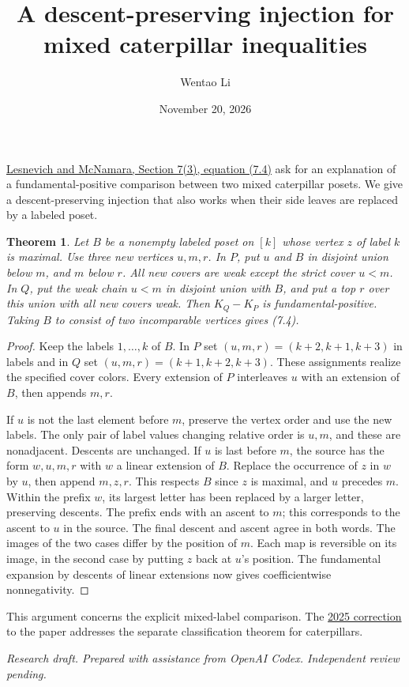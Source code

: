 \documentclass[11pt]{article}
\title{A descent-preserving injection for mixed caterpillar inequalities}
\author{Wentao Li}
\date{November 20, 2026}
\newtheorem{theorem}{Theorem}
\begin{document}
\maketitle

\href{https://arxiv.org/abs/2006.10087}{Lesnevich and McNamara, Section 7(3), equation (7.4)} ask for an explanation of a fundamental-positive comparison between two mixed caterpillar posets. We give a descent-preserving injection that also works when their side leaves are replaced by a labeled poset.
\begin{theorem}Let $B$ be a nonempty labeled poset on $[k]$ whose vertex $z$ of label $k$ is maximal. Use three new vertices $u,m,r$. In $P$, put $u$ and $B$ in disjoint union below $m$, and $m$ below $r$. All new covers are weak except the strict cover $u<m$. In $Q$, put the weak chain $u<m$ in disjoint union with $B$, and put a top $r$ over this union with all new covers weak. Then $K_Q-K_P$ is fundamental-positive. Taking $B$ to consist of two incomparable vertices gives (7.4).\end{theorem}
\begin{proof}Keep the labels $1,\ldots,k$ of $B$. In $P$ set $(u,m,r)=(k+2,k+1,k+3)$ in labels and in $Q$ set $(u,m,r)=(k+1,k+2,k+3)$. These assignments realize the specified cover colors. Every extension of $P$ interleaves $u$ with an extension of $B$, then appends $m,r$.

If $u$ is not the last element before $m$, preserve the vertex order and use the new labels. The only pair of label values changing relative order is $u,m$, and these are nonadjacent. Descents are unchanged. If $u$ is last before $m$, the source has the form $w,u,m,r$ with $w$ a linear extension of $B$. Replace the occurrence of $z$ in $w$ by $u$, then append $m,z,r$. This respects $B$ since $z$ is maximal, and $u$ precedes $m$. Within the prefix $w$, its largest letter has been replaced by a larger letter, preserving descents. The prefix ends with an ascent to $m$; this corresponds to the ascent to $u$ in the source. The final descent and ascent agree in both words. The images of the two cases differ by the position of $m$. Each map is reversible on its image, in the second case by putting $z$ back at $u$'s position. The fundamental expansion by descents of linear extensions now gives coefficientwise nonnegativity.\end{proof}
This argument concerns the explicit mixed-label comparison. The \href{https://doi.org/10.1007/s00026-025-00744-3}{2025 correction} to the paper addresses the separate classification theorem for caterpillars.

\medskip\noindent\textit{Research draft. Prepared with assistance from OpenAI Codex. Independent review pending.}
\end{document}
